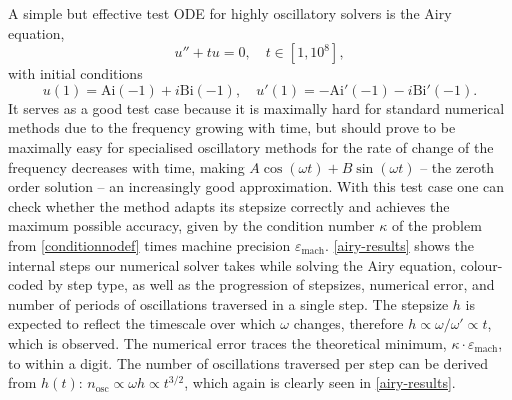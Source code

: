 \documentclass[10pt]{article}
\newcommand{\be}{\begin{equation}}
\newcommand{\ee}{\end{equation}}
\newcommand{\om}{\omega}
\begin{document}
A simple but effective test ODE for highly oscillatory solvers is the Airy equation,
\be
u'' + tu = 0, \quad t \in [1, 10^8], 
\ee
with initial conditions
\be
u(1) = \text{Ai}(-1) + i\text{Bi}(-1), \quad u'(1) = - \text{Ai}'(-1) -i\text{Bi}'(-1).
\ee
It serves as a good test case because it is maximally hard for standard
numerical methods due to the frequency growing with time, but should prove to
be maximally easy for specialised oscillatory methods for the rate of change of
the frequency decreases with time, making $A\cos(\om t) + B\sin(\om t)$ -- the
zeroth order solution -- an increasingly good approximation. With this test
case one can check whether the method adapts its stepsize correctly and
achieves the maximum possible accuracy, given by the condition number $\kappa$ of
the problem from \cref{conditionnodef} times machine precision $\varepsilon_{\text{mach}}$.  
\cref{airy-results} shows the
internal steps our numerical solver takes while solving the Airy equation,
colour-coded by step type, as well as the progression of stepsizes, numerical
error, and number of periods of oscillations traversed in a single step. The
stepsize $h$ is expected to reflect the timescale over which $\om$ changes,
therefore $h \propto \om/\om' \propto t$, which is observed. The numerical
error traces the theoretical minimum, $\kappa \cdot \varepsilon_{\text{mach}}$, to
within a digit. The number of oscillations traversed per step can be derived
from $h(t)$: $n_{\text{osc}} \propto \om h \propto t^{3/2}$, which again is
clearly seen in \cref{airy-results}.
\end{document}
